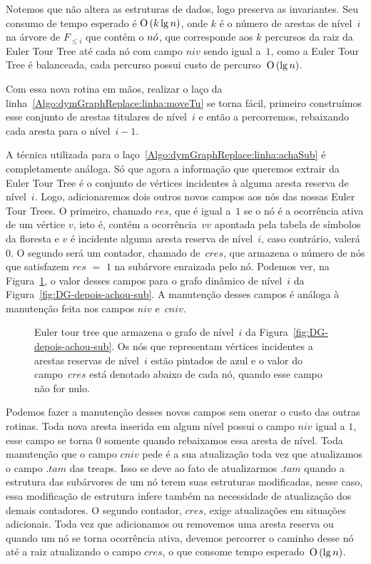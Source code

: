 Notemos que \treapGetEdgesLevel{} não altera as estruturas de dados, logo preserva as invariantes. Seu consumo de tempo esperado é $\text{O}\left(k \lg n\right)$, onde $k$ é o número de arestas de nível~$i$ na árvore de $F_{\leqslant i}$ que contém o $n\acute{o}$, que corresponde aos $k$ percursos da raiz da Euler Tour Tree até cada nó com campo $niv$ sendo igual a~$1$, como a Euler Tour Tree é balanceada, cada percurso possui custo de percurso~$\text{O}\left(\lg n\right)$.

Com essa nova rotina em mãos, realizar o laço da linha~\ref{Algo:dymGraphReplace:linha:moveTu} se torna fácil, primeiro construímos esse conjunto de arestas titulares de nível~$i$ e então a percorremos, rebaixando cada aresta para o nível~$i-1$.

A técnica utilizada para o laço~\ref{Algo:dymGraphReplace:linha:achaSub} é completamente análoga. Só que agora a informação que queremos extrair da Euler Tour Tree é o conjunto de vértices incidentes à alguma aresta reserva de nível~$i$. Logo, adicionaremos dois outros novos campos aos nós das nossas Euler Tour Trees. O primeiro, chamado $res$, que é igual a~$1$ se o nó é a ocorrência ativa de um vértice $v$, isto é, contém a ocorrência~$vv$ apontada pela tabela de símbolos da floresta e $v$ é incidente alguma aresta reserva de nível~$i$, caso contrário, valerá~$0$. O segundo será um contador, chamado de~$cres$, que armazena o número de nós que satisfazem $res$ $=$ $1$ na subárvore enraizada pelo nó. Podemos ver, na Figura~\ref{fig:DG-TREAP-res}, o valor desses campos para o grafo dinâmico de nível~$i$ da Figura~\ref{fig:DG-depois-achou-sub}. A manutenção desses campos é análoga à manutenção feita nos campos $niv$ e~$cniv$.

\begin{figure}[htb]
\scalebox{.61}{
\centering
}
\caption{Euler tour tree que armazena o grafo de nível~$i$ da Figura~\ref{fig:DG-depois-achou-sub}. Os nós que representam vértices incidentes a arestas reservas de nível~$i$ estão pintados de azul e o valor do campo~$cres$ está denotado abaixo de cada nó, quando esse campo não for nulo.}
\label{fig:DG-TREAP-res}
\end{figure}

Podemos fazer a manutenção desses novos campos sem onerar o custo das outras rotinas. Toda nova aresta inserida em algum nível possui o campo $niv$ igual a $1$, esse campo se torna $0$ somente quando rebaixamos essa aresta de nível. Toda manutenção que o campo $cniv$ pede é a sua atualização toda vez que atualizamos o campo $.tam$ das treaps. Isso se deve ao fato de atualizarmos $.tam$ quando a estrutura das subárvores de um nó terem suas estruturas modificadas, nesse caso, essa modificação de estrutura infere também na necessidade de atualização dos demais contadores. O segundo contador, $cres$, exige atualizações em situações adicionais. Toda vez que adicionamos ou removemos uma aresta reserva ou quando um nó se torna ocorrência ativa, devemos percorrer o caminho desse nó até a raiz atualizando o campo $cres$, o que consome tempo esperado~$\text{O}\left(\lg n\right)$.


